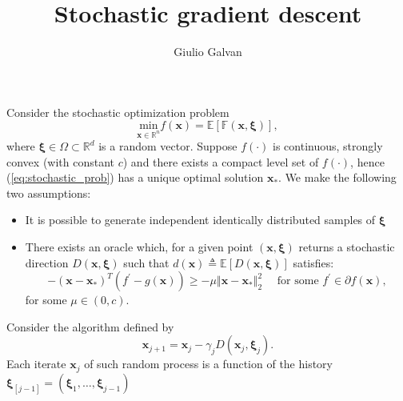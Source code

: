 \documentclass{article}
\title{Stochastic gradient descent}
\author{Giulio Galvan}
\renewcommand{\vec}[1]{\boldsymbol{#1}}
\newcommand{\norm}[1]{\left\Vert #1 \right\Vert}
\newcommand{\defeq}{\triangleq}
\begin{document}
	\maketitle
\noindent
Consider the stochastic optimization problem 
\begin{equation}
	\underset{\vec{x} \in \mathbb{R}^n}{\text{min}} f(\vec{x}) = \mathbb{E[F(\vec{x}, \vec{\xi})]},
	\label{eq:stochastic_prob}
\end{equation}
where $\vec{\xi} \in \Omega \subset \mathbb{R}^d$ is a random vector.
Suppose $f(\cdot)$ is continuous, strongly convex (with constant $c$) and there exists a compact level set of $f(\cdot)$, hence (\ref{eq:stochastic_prob}) has a unique optimal solution $\vec{x}_*$. We make the following two assumptions:
\begin{itemize}
	\item	It is possible to generate independent identically distributed samples of $\vec{\xi}$
	\item There exists an oracle which, for a given point $(\vec{x}, \vec{\xi})$ returns a stochastic direction $D(\vec{x}, \vec{\xi})$ such that $d(\vec{x})\defeq\mathbb{E}[D(\vec{x}, \vec{\xi})]$ satisfies:
	\begin{equation}
	-(\vec{x}-\vec{x}_*)^T (f^{\prime} -g(\vec{x})) \geq -\mu  \norm{\vec{x}-\vec{x}_*}^2_2\quad \text{ for some } f^\prime \in \partial f(\vec{x}),
	\label{eq:angular_condition}
	\end{equation}
	for some $\mu \in (0,c) $.
\end{itemize}
Consider the algorithm defined by
\begin{equation}
	\vec{x}_{j+1} = \vec{x}_j -\gamma_j D(\vec{x}_j,\vec{\xi}_j).
	\label{eq:stochastic_algo}
\end{equation}
Each iterate $\vec{x}_j$ of such random process is a function of the history $\vec{\xi}_{[j-1]}=(\vec{\xi}_1,\dots, \vec{\xi}_{j-1})$
\end{document}
